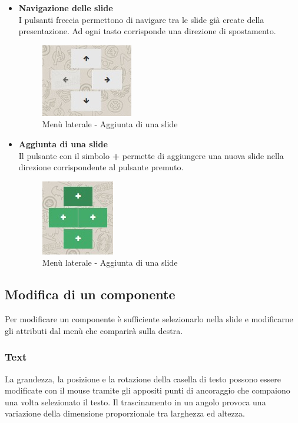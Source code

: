 \begin{itemize}
  \item \textbf{Navigazione delle slide}\\
  I pulsanti freccia permettono di navigare tra le slide già create della presentazione. Ad ogni tasto corrisponde una direzione di spostamento.
  \begin{figure}[h] 
  	\centering 
  	\includegraphics[scale=0.80] {img/editor_move}
  	\caption{Menù laterale - Aggiunta di una slide} 
  \end{figure}
 
 
 
\item \textbf{Aggiunta di una slide}\\
 Il pulsante con il simbolo \textbf{+} permette di aggiungere una nuova slide nella direzione corrispondente al pulsante premuto.
 \begin{figure}[h] 
 	\centering 
 	\includegraphics[scale=0.80] {img/editor_add}
 	\caption{Menù laterale - Aggiunta di una slide} 
 \end{figure}

\end{itemize}


\newpage

\subsection{Modifica di un componente}
Per modificare un componente è sufficiente selezionarlo nella slide e modificarne gli attributi dal menù che comparirà sulla destra.

\subsubsection{Text}
La grandezza, la posizione e la rotazione della casella di testo possono essere modificate con il mouse tramite gli appositi punti di ancoraggio che compaiono una volta selezionato il testo. Il trascinamento in un angolo provoca una variazione della dimensione proporzionale tra larghezza ed altezza.

